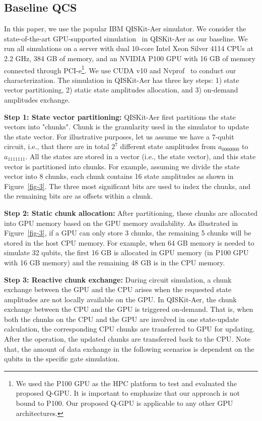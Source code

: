 \subsection{Baseline QCS}
\label{sec:baseline}
In this paper, we use the popular IBM QISKit-Aer simulator. We consider the state-of-the-art GPU-supported simulation~\cite{10.1145/3310273.3323053} in QISKit-Aer as our baseline. We run all simulations on a server with dual 10-core Intel Xeon Silver 4114 CPUs at 2.2 GHz, 384 GB of memory, and an NVIDIA P100 GPU with 16 GB of memory connected through PCI-e\footnote{We used the P100 GPU as the HPC platform to test and evaluated the proposed Q-GPU. It is important to emphasize that our approach is not bound to P100. Our proposed Q-GPU is applicable to any other GPU architectures.}. We use CUDA v10 and Nvprof~\cite{NVIDIAnvprof} to conduct our characterization. The simulation in QISKit-Aer has three key steps: 1) state vector partitioning, 2) static state amplitudes allocation, and 3) on-demand amplitudes exchange. 

\noindent\textbf{Step 1: State vector partitioning:} QISKit-Aer first partitions the state vectors into "chunks". Chunk is the granularity used in the simulator to update the state vector. For illustrative purposes, let us assume we have a 7-qubit circuit, i.e., that there are in total $2^7$ different state amplitudes from $a_{0000000}$ to $a_{1111111}$. All the states are stored in a vector (i.e., the state vector), and this state vector is partitioned into chunks. For example, assuming we divide the state vector into 8 chunks, each chunk contains 16 state amplitudes as shown in Figure~\ref{fig-3}. The three most significant bits are used to index the chunks, and the remaining bits are as offsets within a chunk.

\noindent\textbf{Step 2: Static chunk allocation:} After partitioning, these chunks are allocated into GPU memory based on the GPU memory availability. As illustrated in Figure~\ref{fig-3}, if a GPU can only store 3 chunks, the remaining 5 chunks will be stored in the host CPU memory. For example, when 64 GB memory is needed to simulate 32 qubits, the first 16 GB is allocated in GPU memory (in P100 GPU with 16 GB memory) and the remaining 48 GB is in the CPU memory. 

\noindent\textbf{Step 3: Reactive chunk exchange:} During circuit simulation, a chunk exchange between the GPU and the CPU arises when the requested state amplitudes are not locally available on the GPU. In QISKit-Aer, the chunk exchange between the CPU and the GPU is triggered on-demand. That is, when both the chunks on the CPU and the GPU are involved in one state-update calculation, the corresponding CPU chunks are transferred to GPU for updating. After the operation, the updated chunks are transferred back to the CPU. Note that, the amount of data exchange in the following scenarios is dependent on the qubits in the specific gate simulation.

